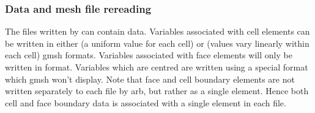 





\subsubsection{Data and mesh file rereading}

The  files written by  can contain data.  Variables associated with cell elements can be written in either  (a uniform value for each cell) or  (values vary linearly within each cell) gmsh formats.  Variables associated with face elements will only be written in  format.  Variables which are  centred are written using a special  format which gmsh won't display.  Note that face and cell boundary elements are not written separately to each  file by arb, but rather as a single element.  Hence both cell and face boundary data is associated with a single element in each  file.


